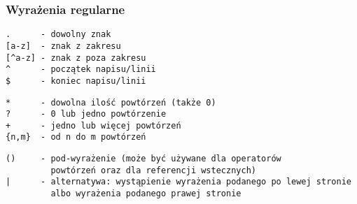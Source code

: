 \documentclass[12pt,aspectratio=169]{beamer}
\begin{document}
\begin{frame}[fragile]

\frametitle{Wyrażenia regularne}

\begin{Verbatim}
.      - dowolny znak
[a-z]  - znak z zakresu
[^a-z] - znak z poza zakresu
^      - początek napisu/linii
$      - koniec napisu/linii
\end{Verbatim}
\vspace{4pt}
\begin{Verbatim}
*      - dowolna ilość powtórzeń (także 0)
?      - 0 lub jedno powtórzenie
+      - jedno lub więcej powtórzeń
{n,m}  - od n do m powtórzeń
\end{Verbatim}
\vspace{4pt}
\begin{Verbatim}
()     - pod-wyrażenie (może być używane dla operatorów
         powtórzeń oraz dla referencji wstecznych)
|      - alternatywa: wystąpienie wyrażenia podanego po lewej stronie
         albo wyrażenia podanego prawej stronie
\end{Verbatim}

\end{frame}
\end{document}
